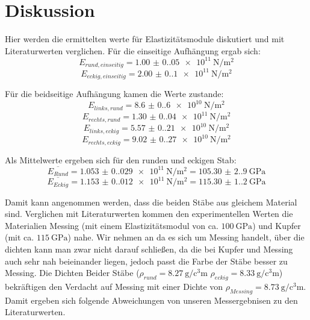 \section{Diskussion}
\label{sec:Diskussion}
Hier werden die ermittelten werte für Elastizitätsmodule diskutiert und mit Literaturwerten verglichen.
Für die einseitige Aufhängung ergab sich:
\begin{equation*}
    E_{rund,einseitig} = \qty{1.00(0.05)e11}{\newton\per\meter\squared}
  \end{equation*}
\begin{equation*}
    E_{eckig,einseitig} = \qty{2.00(0.1)e11}{\newton\per\meter\squared}
\end{equation*}

Für die beidseitige Aufhängung kamen die Werte zustande:
\begin{equation*}
    E_{links,rund} = \qty{8.6(0.6)e10}{\newton\per\meter\squared}
  \end{equation*}
\begin{equation*}
    E_{rechts,rund} = \qty{1.30(0.04)e11}{\newton\per\meter\squared}
\end{equation*}
\begin{equation*}
    E_{links,eckig} = \qty{5.57(0.21)e10}{\newton\per\meter\squared}
\end{equation*}
\begin{equation*}
    E_{rechts,eckig} = \qty{9.02(0.27)e10}{\newton\per\meter\squared}
\end{equation*}

Als Mittelwerte ergeben sich für den runden und eckigen Stab:
\begin{equation*}
    \overline{E_{Rund}} = \qty{1.053(0.029)e11}{\newton\per\meter\squared} = \qty{105.30(2.90)}{\giga\pascal}
\end{equation*}
\begin{equation*}
    \overline{E_{Eckig}} = \qty{1.153(0.012)e11}{\newton\per\meter\squared} = \qty{115.30(1.20)}{\giga\pascal}
\end{equation*}

\noindent Damit kann angenommen werden, dass die beiden Stäbe aus gleichem Material sind. 
Verglichen mit Literaturwerten kommen den experimentellen Werten die Materialien
Messing (mit einem Elastizitätsmodul von ca. $\qty{100}{\giga\pascal}$) und 
Kupfer (mit ca. $\qty{115}{\giga\pascal}$) nahe. Wir 
nehmen an da es sich um Messing handelt, über die dichten kann man zwar nicht darauf schließen, 
da die bei Kupfer und Messing auch sehr nah beieinander liegen, jedoch passt die Farbe der Stäbe 
besser zu Messing. Die Dichten Beider Stäbe ($\rho_{rund} = \qty{8.27}{\gram\per\cubic\centi\meter}$
$\rho_{eckig} = \qty{8.33}{\gram\per\cubic\centi\meter}$) bekräftigen den Verdacht auf Messing mit 
einer Dichte von $\rho_{Messing} = \qty{8.73}{\gram\per\cubic\centi\meter}$. Damit ergeben sich folgende 
Abweichungen von unseren Messergebnisen zu den Literaturwerten.

